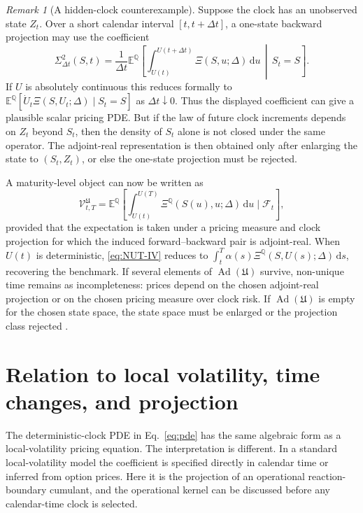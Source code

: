 \documentclass[11pt]{amsart}
\newcommand{\E}{\mathbb{E}}
\newcommand{\Q}{\mathbb{Q}}
\newcommand{\dd}{\,\mathrm{d}}
\newcommand{\Xiop}{\Xi}
\newcommand{\V}{\mathcal{V}}
\newcommand{\Ad}{\operatorname{Ad}}
\theoremstyle{definition}
\theoremstyle{plain}
\theoremstyle{remark}
\newtheorem{remark}{Remark}
\begin{document}
\begin{remark}[A hidden-clock counterexample]
Suppose the clock has an unobserved state $Z_t$. Over a short calendar
interval $[t,t+\Delta t]$, a one-state backward projection may use the coefficient
\begin{equation}
 \Sigma_{\Delta t}^2(S,t)
 =
 \frac{1}{\Delta t}
 \E^\Q\!\left[
   \int_{U(t)}^{U(t+\Delta t)}
   \Xiop(S,u;\Delta)\dd u
   \,\middle|\, S_t=S
 \right].
\end{equation}
If $U$ is absolutely continuous this reduces formally to
$\E^\Q[\dot U_t\Xiop(S,U_t;\Delta)\mid S_t=S]$ as $\Delta t \downarrow0$.
Thus the displayed coefficient can give a plausible scalar pricing PDE.
But if the law of future clock increments depends on $Z_t$ beyond $S_t$,
then the density of $S_t$ alone is not closed under the same operator.
The adjoint-real representation is then obtained only after enlarging the
state to $(S_t,Z_t)$, or else the one-state projection must be rejected.
\end{remark}

A maturity-level object can now be written as
\begin{equation}
 \V_{t,T}^{\mathfrak U}=\E^\Q\left[\int_{U(t)}^{U(T)}\Xiop^\Q(S(u),u;\Delta)\dd u\mid\mathcal F_t\right],
 \label{eq:NUT-IV}
\end{equation}
provided that the expectation is taken under a pricing measure and clock projection for which the induced forward--backward pair is adjoint-real. When $U(t)$ is deterministic, \eqref{eq:NUT-IV} reduces to $\int_t^T\alpha(s)\Xiop^\Q(S,U(s);\Delta)\dd s$, recovering the benchmark. If several elements of $\Ad(\mathfrak U)$ survive, non-unique time remains as incompleteness: prices depend on the chosen adjoint-real projection or on the chosen pricing measure over clock risk. If $\Ad(\mathfrak U)$ is empty for the chosen state space, the state space must be enlarged or the projection class rejected \cite{AngstmannGebbie2026NonUniqueTime}.

\section{Relation to local volatility, time changes, and projection}

The deterministic-clock PDE in Eq.~\eqref{eq:pde} has the same algebraic form as a local-volatility pricing equation. The interpretation is different. In a standard local-volatility model the coefficient is specified directly in calendar time or inferred from option prices. Here it is the projection of an operational reaction-boundary cumulant, and the operational kernel can be discussed before any calendar-time clock is selected.
\end{document}
